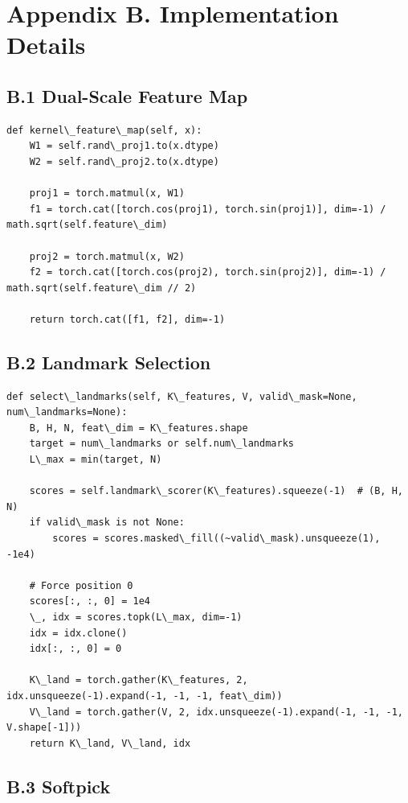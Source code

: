 \section{Appendix B. Implementation Details}

\subsection{B.1 Dual-Scale Feature Map}

\begin{lstlisting}
def kernel\_feature\_map(self, x):
    W1 = self.rand\_proj1.to(x.dtype)
    W2 = self.rand\_proj2.to(x.dtype)
    
    proj1 = torch.matmul(x, W1)
    f1 = torch.cat([torch.cos(proj1), torch.sin(proj1)], dim=-1) / math.sqrt(self.feature\_dim)
    
    proj2 = torch.matmul(x, W2)
    f2 = torch.cat([torch.cos(proj2), torch.sin(proj2)], dim=-1) / math.sqrt(self.feature\_dim // 2)
    
    return torch.cat([f1, f2], dim=-1)
\end{lstlisting}

\subsection{B.2 Landmark Selection}

\begin{lstlisting}
def select\_landmarks(self, K\_features, V, valid\_mask=None, num\_landmarks=None):
    B, H, N, feat\_dim = K\_features.shape
    target = num\_landmarks or self.num\_landmarks
    L\_max = min(target, N)
    
    scores = self.landmark\_scorer(K\_features).squeeze(-1)  # (B, H, N)
    if valid\_mask is not None:
        scores = scores.masked\_fill((~valid\_mask).unsqueeze(1), -1e4)
    
    # Force position 0
    scores[:, :, 0] = 1e4
    \_, idx = scores.topk(L\_max, dim=-1)
    idx = idx.clone()
    idx[:, :, 0] = 0
    
    K\_land = torch.gather(K\_features, 2, idx.unsqueeze(-1).expand(-1, -1, -1, feat\_dim))
    V\_land = torch.gather(V, 2, idx.unsqueeze(-1).expand(-1, -1, -1, V.shape[-1]))
    return K\_land, V\_land, idx
\end{lstlisting}

\subsection{B.3 Softpick}

